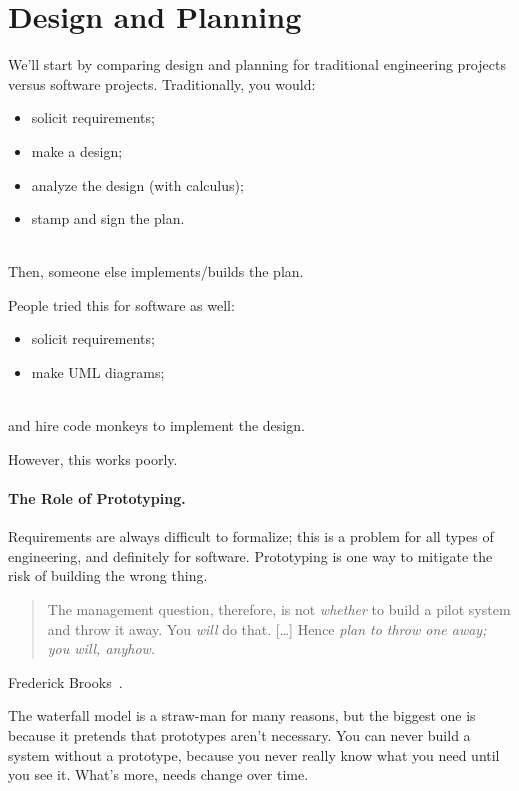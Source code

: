 





\section*{Design and Planning}
We'll start by comparing design and planning for traditional engineering
projects versus software projects.
Traditionally, you would:\\[-2.5em]
\begin{itemize}
\item solicit requirements;
\item make a design;
\item analyze the design (with calculus);
\item stamp and sign the plan.
\end{itemize}~\\[-2.5em]
Then, someone else implements/builds the plan.

People tried this for software as well:\\[-2.5em]
\begin{itemize}
\item solicit requirements;
\item make UML diagrams; 
\end{itemize}~\\[-2.5em]
and hire code monkeys to implement the design.

\noindent However, this works poorly.

\paragraph{The Role of Prototyping.} Requirements are always difficult to 
formalize; this is a problem for all types of engineering, and
definitely for software. Prototyping is one way to mitigate the risk
of building the wrong thing.

\begin{quote}
The management question, therefore, is not {\em whether} to build a pilot system and throw it away. You {\em will} do that. [\ldots] Hence {\em plan to throw one away; you will, anyhow}.
\end{quote}
\hfill Frederick Brooks~\cite{mmm}.

The waterfall model is a straw-man for many reasons, but the
biggest one is because it pretends that prototypes aren't necessary.
You can never build a system without a prototype, because you never
really know what you need until you see it.  What's more, needs change
over time.

